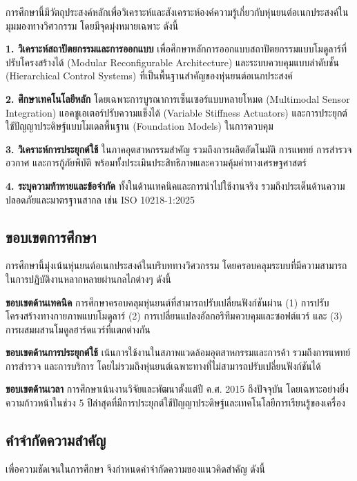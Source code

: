 \documentclass[a4paper]{article}
\begin{document}
การศึกษานี้มีวัตถุประสงค์หลักเพื่อวิเคราะห์และสังเคราะห์องค์ความรู้เกี่ยวกับหุ่นยนต์อเนกประสงค์ในมุมมองทางวิศวกรรม โดยมีจุดมุ่งหมายเฉพาะ ดังนี้

\textbf{1. วิเคราะห์สถาปัตยกรรมและการออกแบบ} เพื่อศึกษาหลักการออกแบบสถาปัตยกรรมแบบโมดูลาร์ที่ปรับโครงสร้างได้ (Modular Reconfigurable Architecture) และระบบควบคุมแบบลำดับชั้น (Hierarchical Control Systems) ที่เป็นพื้นฐานสำคัญของหุ่นยนต์อเนกประสงค์ \parencite{tassi2024multimodal}

\textbf{2. ศึกษาเทคโนโลยีหลัก} โดยเฉพาะการบูรณาการเซ็นเซอร์แบบหลายโหมด (Multimodal Sensor Integration) \parencite{yang2024body} แอคชูเอเตอร์ปรับความแข็งได้ (Variable Stiffness Actuators) และการประยุกต์ใช้ปัญญาประดิษฐ์แบบโมเดลพื้นฐาน (Foundation Models) ในการควบคุม

\textbf{3. วิเคราะห์การประยุกต์ใช้} ในภาคอุตสาหกรรมสำคัญ รวมถึงการผลิตอัตโนมัติ การแพทย์ การสำรวจอวกาศ และการกู้ภัยพิบัติ พร้อมทั้งประเมินประสิทธิภาพและความคุ้มค่าทางเศรษฐศาสตร์

\textbf{4. ระบุความท้าทายและข้อจำกัด} ทั้งในด้านเทคนิคและการนำไปใช้งานจริง รวมถึงประเด็นด้านความปลอดภัยและมาตรฐานสากล เช่น ISO 10218-1:2025 \parencite{iso2025robotics}

\subsection{ขอบเขตการศึกษา}

การศึกษานี้มุ่งเน้นหุ่นยนต์อเนกประสงค์ในบริบททางวิศวกรรม โดยครอบคลุมระบบที่มีความสามารถในการปฏิบัติงานหลากหลายผ่านกลไกต่างๆ ดังนี้

\textbf{ขอบเขตด้านเทคนิค} การศึกษาครอบคลุมหุ่นยนต์ที่สามารถปรับเปลี่ยนฟังก์ชันผ่าน (1) การปรับโครงสร้างทางกายภาพแบบโมดูลาร์ (2) การเปลี่ยนแปลงอัลกอริทึมควบคุมและซอฟต์แวร์ และ (3) การผสมผสานโมดูลฮาร์ดแวร์ที่แตกต่างกัน

\textbf{ขอบเขตด้านการประยุกต์ใช้} เน้นการใช้งานในสภาพแวดล้อมอุตสาหกรรมและการค้า รวมถึงการแพทย์ การสำรวจ และการบริการ โดยไม่รวมถึงหุ่นยนต์เฉพาะทางที่ไม่สามารถปรับเปลี่ยนฟังก์ชันได้

\textbf{ขอบเขตด้านเวลา} การศึกษาเน้นงานวิจัยและพัฒนาตั้งแต่ปี ค.ศ. 2015 ถึงปัจจุบัน โดยเฉพาะอย่างยิ่งความก้าวหน้าในช่วง 5 ปีล่าสุดที่มีการประยุกต์ใช้ปัญญาประดิษฐ์และเทคโนโลยีการเรียนรู้ของเครื่อง

\subsection{คำจำกัดความสำคัญ}

เพื่อความชัดเจนในการศึกษา จึงกำหนดคำจำกัดความของแนวคิดสำคัญ ดังนี้
\end{document}
